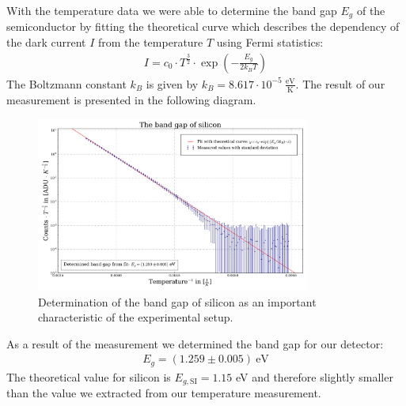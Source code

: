 With  the temperature data we were able to determine the band gap $E_g$ of the semiconductor by fitting the theoretical curve which describes the dependency of the dark current $I$ from the temperature $T$ using Fermi statistics:
\begin{align}
	I = c_0 \cdot T^{\frac{3}{2}}\cdot\exp(-\frac{E_g}{2 k_B T}) \label{eqn: dark current}
\end{align}
The Boltzmann constant $k_B$ is given by $k_B = 8.617 \cdot 10^{-5} \ \frac{\text{eV}}{\text{K}}$.
The result of our measurement is presented in the following diagram.
\begin{figure}[H]
\centering
\includegraphics[width=0.8\textwidth]{figures/Plots/band_gap.pdf}
\caption[Determination of the band gap of silicon]{Determination of the band gap of silicon as an important characteristic of the experimental setup.}	
\end{figure}
As a result of the measurement we determined the band gap for our detector:
\begin{align}
	E_g = (1.259 \pm 0.005) \ \text{eV}
\end{align}
The theoretical value for silicon is $E_{g, \text{SI}} = 1.15$ eV and therefore slightly smaller than the value we extracted from our temperature measurement. 
\newpage
